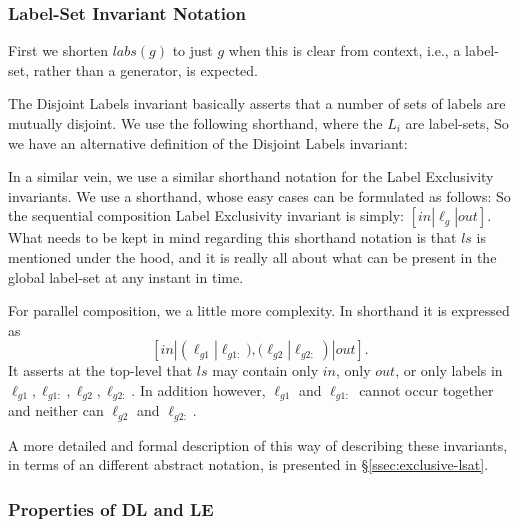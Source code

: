 \subsubsection{Label-Set Invariant Notation}

First we shorten $labs(g)$ to just $g$ when this is clear from context,
i.e., a label-set, rather than a generator, is expected.

The Disjoint Labels invariant basically asserts
that a number of sets of labels are mutually disjoint.
We use the following shorthand, where the $L_i$ are label-sets,
So we have an alternative definition of the Disjoint Labels invariant:

In a similar vein, we use a similar shorthand notation
for the Label Exclusivity invariants.
We use a shorthand,
whose easy cases can be formulated as follows:
So the sequential composition Label Exclusivity invariant
is simply: $[in|\ell_g|out]$.
What needs to be kept in mind regarding this shorthand notation
is that $ls$ is mentioned under the hood,
and it is really all about what can be present in the global label-set
at any instant in time.

For parallel composition, we a little more complexity.
In shorthand it is expressed as
\[
   [in|(\ell_{g1}|\ell_{g1:}),(\ell_{g2}|\ell_{g2:})|out].
\]
It asserts at the top-level that $ls$
may contain only $in$, only $out$,
or only labels in $\ell_{g1},\ell_{g1:},\ell_{g2},\ell_{g2:}$.
In addition however, $\ell_{g1}$ and $\ell_{g1:}$ cannot occur together
and neither can $\ell_{g2}$ and $\ell_{g2:}$.

A more detailed and formal description of this way of describing
these invariants, in terms of an different abstract notation,
is presented in \S\ref{ssec:exclusive-lsat}.

\subsubsection{Properties of DL and LE}

